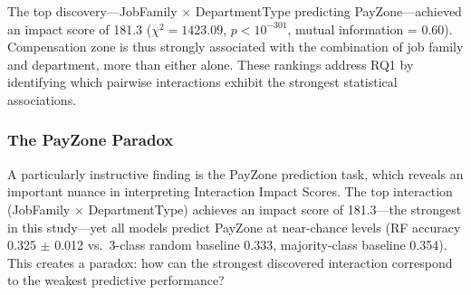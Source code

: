 \documentclass[conference]{IEEEtran}
\begin{document}
\begin{table}[htb]
\centering
\renewcommand{\arraystretch}{1.15}
\caption{Top 10 interaction discoveries ranked by Interaction Impact Score.}
\label{tab:top10}
\end{table}

The top discovery---JobFamily $\times$ DepartmentType predicting PayZone---achieved an impact score of 181.3 ($\chi^2 = 1423.09$, $p < 10^{-301}$, mutual information = 0.60). Compensation zone is thus strongly associated with the combination of job family and department, more than either alone. These rankings address RQ1 by identifying which pairwise interactions exhibit the strongest statistical associations.

\subsubsection{The PayZone Paradox}

A particularly instructive finding is the PayZone prediction task, which reveals an important nuance in interpreting Interaction Impact Scores. The top interaction (JobFamily $\times$ DepartmentType) achieves an impact score of 181.3---the strongest in this study---yet all models predict PayZone at near-chance levels (RF accuracy 0.325 $\pm$ 0.012 vs.\ 3-class random baseline 0.333, majority-class baseline 0.354). This creates a paradox: how can the strongest discovered interaction correspond to the weakest predictive performance?
\end{document}
